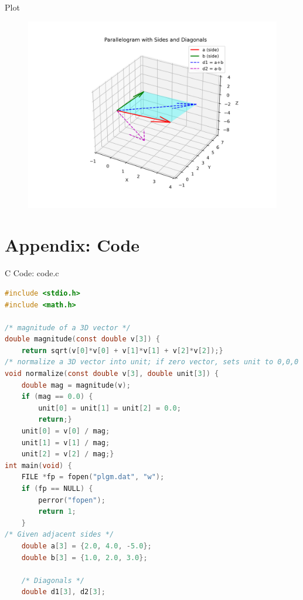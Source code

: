 \documentclass{beamer}
\numberwithin{equation}{section}
\theoremstyle{remark}
\begin{document}
\begin{frame}{Plot}
  \begin{figure}[H]
    \centering
    \includegraphics[width=1.0\columnwidth]{figs/01.png}
    \label{fig-1}
\end{figure}  
\end{frame}

\section*{Appendix: Code}

\begin{frame}[fragile]{C Code: code.c}
\begin{lstlisting}[language=C]
#include <stdio.h>
#include <math.h>

/* magnitude of a 3D vector */
double magnitude(const double v[3]) {
    return sqrt(v[0]*v[0] + v[1]*v[1] + v[2]*v[2]);}
/* normalize a 3D vector into unit; if zero vector, sets unit to 0,0,0 */
void normalize(const double v[3], double unit[3]) {
    double mag = magnitude(v);
    if (mag == 0.0) {
        unit[0] = unit[1] = unit[2] = 0.0;
        return;}
    unit[0] = v[0] / mag;
    unit[1] = v[1] / mag;
    unit[2] = v[2] / mag;}
int main(void) {
    FILE *fp = fopen("plgm.dat", "w");
    if (fp == NULL) {
        perror("fopen");
        return 1;
    }
/* Given adjacent sides */
    double a[3] = {2.0, 4.0, -5.0};
    double b[3] = {1.0, 2.0, 3.0};

    /* Diagonals */
    double d1[3], d2[3];
    \end{lstlisting}
\end{frame}
\end{document}
